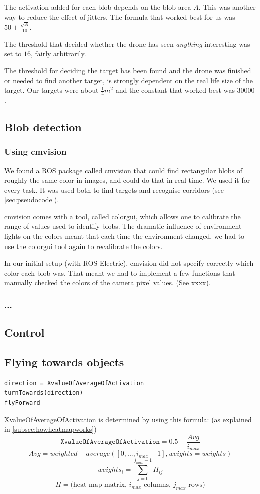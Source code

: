 \documentclass[a4paper,10pt]{article}
\begin{document}
The activation added for each blob depends on the blob area $A$. This was
another way to reduce the effect of jitters. The formula
that worked best for us was $50 + \frac{\sqrt{A}}{10}$.

The threshold that decided whether the drone has seen \emph{anything}
interesting was set to $16$, fairly arbitrarily.

The threshold for deciding the target has been found and the drone was
finished or needed to find another target, is strongly dependent on the
real life size of the target. Our targets were about $\frac{1}{4} m^2$
and the constant that worked best was $30 000$.


\subsection{Blob detection}
\subsubsection{Using cmvision}
We found a ROS package called cmvision that could find rectangular blobs of
roughly the same color in images, and could do that in real time. We used
it for every task. It was used both to find targets and recognise
corridors (see \ref{sec:pseudocode}).

cmvision comes with a tool, called colorgui, which allows one to calibrate the
range of values used to identify blobs. The dramatic influence of environment
lights on the colors meant that each time the environment changed, we had to
use the colorgui tool again to recalibrate the colors.

In our initial setup (with ROS Electric), cmvision did not specify correctly
which color each blob was. That meant we had to implement a few functions that
manually checked the colors of the camera pixel values. (See xxxx).
\subsubsection{...}

\subsection{Control}

\subsection{Flying towards objects\label{flytowards}}
\begin{verbatim}
direction = XvalueOfAverageOfActivation
turnTowards(direction)
flyForward
\end{verbatim}
XvalueOfAverageOfActivation is determined by using this formula: (as explained in \ref{subsec:howheatmapworks})
\[\texttt{XvalueOfAverageOfActivation} = 0.5 - \frac{Avg}{i_{max}}\]
\[Avg = weighted-average([0, ..., i_{max} - 1], weights=weights)\]
\[weights_i = \sum_{j=0}^{j_{max}-1} H_{ij} \]
\[H = \textrm{(heat map matrix, $i_{max}$ columns, $j_{max}$ rows)}\]
\end{document}
